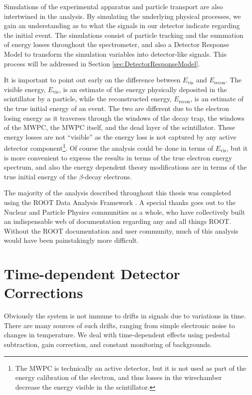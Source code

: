 Simulations of the experimental apparatus and particle transport are also intertwined
in the analysis. By simulating the underlying physical processes, we gain an understanding
as to what the signals in our detector indicate regarding the initial event. The simulations
consist of particle tracking and the summation of energy losses throughout
the spectrometer, and also a Detector Response Model to transform the simulation variables
into detector-like signals. This process will be addressed in Section \ref{sec:DetectorResponseModel}.

It is important to point out early on the difference between $E_{\mathrm{vis}}$ and
$E_{\mathrm{recon}}$. The  visible energy, $E_{\mathrm{vis}}$, is an estimate of the energy
physically deposited in the
scintillator by a particle, while the reconstructed energy, $E_{\mathrm{recon}}$, is an estimate of
the true initial energy of an event. The two are different due to the electron losing energy
as it traverses through the windows of the decay trap, the windows of the MWPC,
the MWPC itself, and the dead layer of the scintillator. These energy losses are not
``visible'' as the energy loss is not captured by any active detector component\footnote{The MWPC is technically
  an active detector, but it is not used as part of the energy calibration of the electron, and thus losses in
the wirechamber decrease the energy visible in the scintillator.}.
Of course the analysis could be
done in terms of $E_{\mathrm{vis}}$, but it is more convenient to express the results
in terms of the true electron energy spectrum, and also the energy dependent theory modifications
are in terms of the true initial energy of the $\beta$-decay electrons.

The majority of the analysis described throughout this thesis was completed using
the ROOT Data Analysis Framework \cite{brun1997root}. A special thanks goes out to
the Nuclear and Particle Physics communities as a whole, who have collectively built an indispensable
web of documentation regarding any and all things ROOT. Without the ROOT documentation
and user community, much of this analysis would have been painstakingly more difficult.




\section{Time-dependent Detector Corrections}

Obviously the system is not immune to drifts in signals due to variations
in time. There are many sources of such drifts, ranging from simple
electronic noise to changes in temperature. We deal with time-dependent
effects using pedestal subtraction, gain correction, and constant monitoring
of backgrounds.

